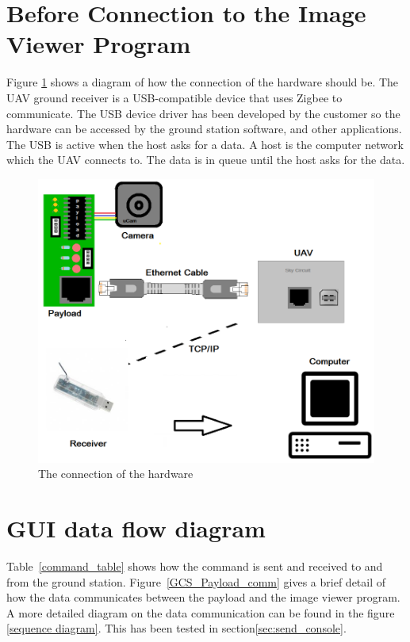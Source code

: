 \section{Before Connection to the Image Viewer Program}
Figure \ref{schemetic_clipA} shows a diagram of how the connection of the hardware should be. 
The UAV ground receiver is a USB-compatible device that uses Zigbee to communicate. 
The USB device driver has been developed by the customer so the hardware can be accessed by the ground station software, and other applications. 
The USB is active when the host asks for a data. 
A host is the computer network which the UAV connects to. 
The data is in queue until the host asks for the data. 
\begin{figure}[!hbtp]
\begin{center}
\includegraphics[scale=0.4]{figures/clipArt.png} 
\end{center}
\caption{The connection of the hardware\label{schemetic_clipA}}
\end{figure}


\section{GUI data flow diagram}

Table~\ref{command_table} shows how the command is sent and received to and from the ground station.  Figure~\ref{GCS_Payload_comm} gives a brief detail of how the data communicates between the payload and the image viewer program. 
A more detailed diagram on the data communication can be found in the figure \ref{sequence diagram}.
This has been tested in section\ref{sec:send_console}.

